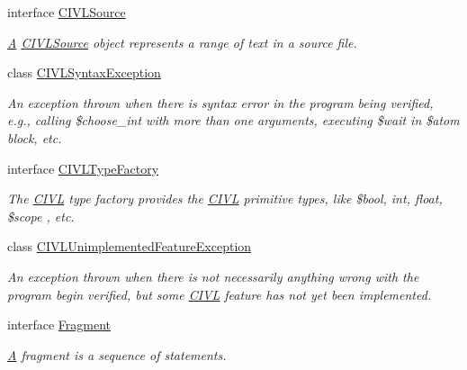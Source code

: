 \begin{DoxyCompactItemize}
interface \hyperlink{interfaceedu_1_1udel_1_1cis_1_1vsl_1_1civl_1_1model_1_1IF_1_1CIVLSource}{C\+I\+V\+L\+Source}
\begin{DoxyCompactList}\small\item\em \hyperlink{structA}{A} \hyperlink{interfaceedu_1_1udel_1_1cis_1_1vsl_1_1civl_1_1model_1_1IF_1_1CIVLSource}{C\+I\+V\+L\+Source} object represents a range of text in a source file. \end{DoxyCompactList}\item 
class \hyperlink{classedu_1_1udel_1_1cis_1_1vsl_1_1civl_1_1model_1_1IF_1_1CIVLSyntaxException}{C\+I\+V\+L\+Syntax\+Exception}
\begin{DoxyCompactList}\small\item\em An exception thrown when there is syntax error in the program being verified, e.\+g., calling \$choose\+\_\+int with more than one arguments, executing \$wait in \$atom block, etc. \end{DoxyCompactList}\item 
interface \hyperlink{interfaceedu_1_1udel_1_1cis_1_1vsl_1_1civl_1_1model_1_1IF_1_1CIVLTypeFactory}{C\+I\+V\+L\+Type\+Factory}
\begin{DoxyCompactList}\small\item\em The \hyperlink{classedu_1_1udel_1_1cis_1_1vsl_1_1civl_1_1CIVL}{C\+I\+V\+L} type factory provides the \hyperlink{classedu_1_1udel_1_1cis_1_1vsl_1_1civl_1_1CIVL}{C\+I\+V\+L} primitive types, like {\ttfamily \$bool}, {\ttfamily int}, {\ttfamily float}, {\ttfamily \$scope} , etc. \end{DoxyCompactList}\item 
class \hyperlink{classedu_1_1udel_1_1cis_1_1vsl_1_1civl_1_1model_1_1IF_1_1CIVLUnimplementedFeatureException}{C\+I\+V\+L\+Unimplemented\+Feature\+Exception}
\begin{DoxyCompactList}\small\item\em An exception thrown when there is not necessarily anything wrong with the program begin verified, but some \hyperlink{classedu_1_1udel_1_1cis_1_1vsl_1_1civl_1_1CIVL}{C\+I\+V\+L} feature has not yet been implemented. \end{DoxyCompactList}\item 
interface \hyperlink{interfaceedu_1_1udel_1_1cis_1_1vsl_1_1civl_1_1model_1_1IF_1_1Fragment}{Fragment}
\begin{DoxyCompactList}\small\item\em \hyperlink{structA}{A} fragment is a sequence of statements. \end{DoxyCompactList}\item 

\end{DoxyCompactItemize}
